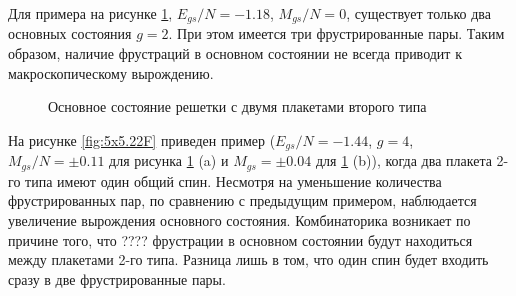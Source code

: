 \documentclass[utf8, babel, sor, jor, amsmath, amssymb, reprint]{elsarticle} %
\begin{document}
Для примера на рисунке \ref{fig:4x7}, $E_{gs}/N=-1.18$, $M_{gs}/N=0$, существует только два основных состояния $g=2$. При этом имеется три фрустрированные пары. Таким образом, наличие фрустраций в основном состоянии не всегда приводит к макроскопическому вырождению. 

\begin{figure}[H]
	\centering
	\caption{Основное состояние решетки с двумя плакетами второго типа}
	\label{fig:4x7}
\end{figure}

На рисунке \ref{fig:5x5.22F} приведен пример ($E_{gs}/N=-1.44$, $g=4$, $M_{gs}/N=\pm 0.11$ для рисунка \ref{fig:4x7} (a) и $M_{gs}=\pm 0.04$ для \ref{fig:4x7} (b)), когда два плакета 2-го типа имеют один общий спин. Несмотря на уменьшение количества фрустрированных пар, по сравнению с предыдущим примером, наблюдается увеличение вырождения основного состояния. Комбинаторика возникает по причине того, что ???? фрустрации в основном состоянии будут находиться между плакетами 2-го типа. Разница лишь в том, что один спин будет входить сразу в две фрустрированные пары.
\end{document}
